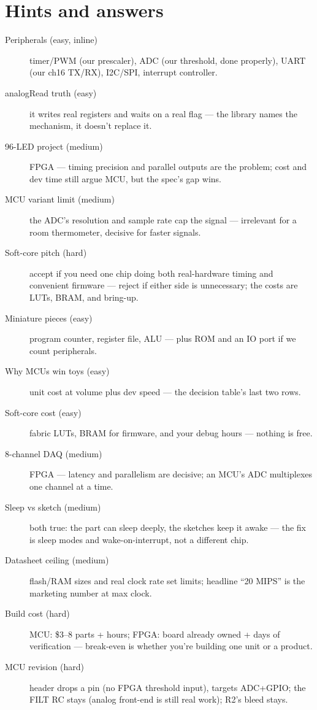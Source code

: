 \section*{Hints and answers}
\begin{description}
\item[Peripherals (easy, inline)] timer/PWM (our prescaler), ADC
(our threshold, done properly), UART (our ch16 TX/RX), I2C/SPI,
interrupt controller.
\item[analogRead truth (easy)] it writes real registers and waits
on a real flag --- the library names the mechanism, it doesn't
replace it.
\item[96-LED project (medium)] FPGA --- timing precision and
parallel outputs are the problem; cost and dev time still argue
MCU, but the spec's gap wins.
\item[MCU variant limit (medium)] the ADC's resolution and sample
rate cap the signal --- irrelevant for a room thermometer,
decisive for faster signals.
\item[Soft-core pitch (hard)] accept if you need one chip doing
both real-hardware timing and convenient firmware --- reject if
either side is unnecessary; the costs are LUTs, BRAM, and bring-up.
\item[Miniature pieces (easy)] program counter, register file,
ALU --- plus ROM and an I\/O port if we count peripherals.
\item[Why MCUs win toys (easy)] unit cost at volume plus dev
speed --- the decision table's last two rows.
\item[Soft-core cost (easy)] fabric LUTs, BRAM for firmware, and
your debug hours --- nothing is free.
\item[8-channel DAQ (medium)] FPGA --- latency and parallelism are
decisive; an MCU's ADC multiplexes one channel at a time.
\item[Sleep vs sketch (medium)] both true: the part can sleep
deeply, the sketches keep it awake --- the fix is sleep modes and
wake-on-interrupt, not a different chip.
\item[Datasheet ceiling (medium)] flash/RAM sizes and real clock
rate set limits; headline ``20 MIPS'' is the marketing number at
max clock.
\item[Build cost (hard)] MCU: \$3--8 parts + hours; FPGA: board
already owned + days of verification --- break-even is whether
you're building one unit or a product.
\item[MCU revision (hard)] header drops a pin (no FPGA threshold
input), targets ADC+GPIO; the FILT RC stays (analog front-end is
still real work); R2's bleed stays.
\end{description}


